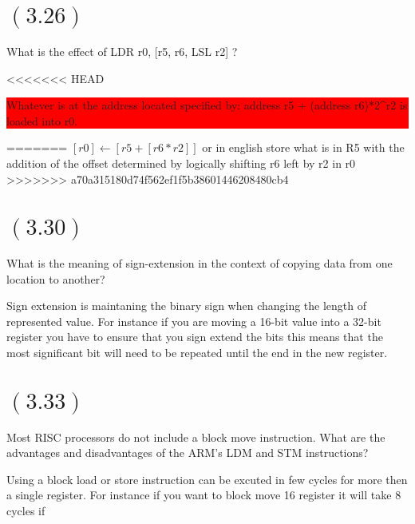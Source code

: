 \documentclass[letterpaper,12pt,titlepage]{article}
\begin{document}
\section*{$(3.26)$} What is the effect of LDR r0, [r5, r6, LSL r2] ?

\begin{mdframed}[style=MyFrame]
<<<<<<< HEAD
\colorbox{red}{
  
Whatever is at the address located specified by: address r5 + (address r6)*2^r2 is loaded into r0.


}
=======
$[r0] \leftarrow [r5+[r6 * r2] ]$ or in english store what is in R5 with the addition of the offset determined by logically shifting r6 left by r2 in r0
>>>>>>> a70a315180d74f562ef1f5b38601446208480cb4
\end{mdframed}

\section*{$(3.30)$} What is the meaning of sign-extension in the context of copying data from one location to another?

\begin{mdframed}[style=MyFrame]
Sign extension is maintaning the binary sign when changing the length of represented value. For instance if you are moving a 16-bit value into a 32-bit register you have to ensure that you sign extend the bits this means that the most significant bit will need to be repeated until the end in the new register.  
\end{mdframed}

\section*{$(3.33)$} Most RISC processors do not include a block move instruction. What are the advantages and disadvantages of the ARM's LDM and STM instructions?

\begin{mdframed}[style=MyFrame]
Using a block load or store instruction can be excuted in few cycles for more then a single register. For instance if you want to block move 16 register it will take 8 cycles if 
\end{mdframed}

\newpage
\end{document}

